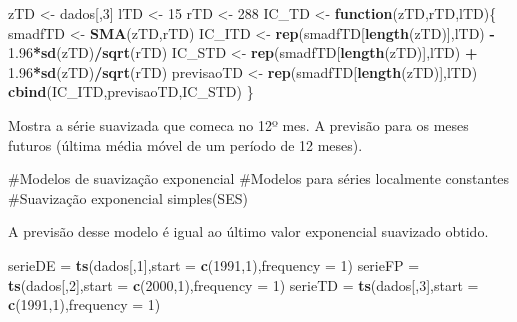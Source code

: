 \documentclass[]{article}
\newenvironment{Shaded}{\begin{snugshade}}{\end{snugshade}}
\newcommand{\ControlFlowTok}[1]{\textcolor[rgb]{0.13,0.29,0.53}{\textbf{#1}}}
\newcommand{\DataTypeTok}[1]{\textcolor[rgb]{0.13,0.29,0.53}{#1}}
\newcommand{\DecValTok}[1]{\textcolor[rgb]{0.00,0.00,0.81}{#1}}
\newcommand{\FloatTok}[1]{\textcolor[rgb]{0.00,0.00,0.81}{#1}}
\newcommand{\KeywordTok}[1]{\textcolor[rgb]{0.13,0.29,0.53}{\textbf{#1}}}
\newcommand{\NormalTok}[1]{#1}
\newcommand{\OperatorTok}[1]{\textcolor[rgb]{0.81,0.36,0.00}{\textbf{#1}}}
\newcommand{\StringTok}[1]{\textcolor[rgb]{0.31,0.60,0.02}{#1}}
\begin{document}
\begin{Shaded}
\begin{Highlighting}[]
\NormalTok{zTD <-}\StringTok{ }\NormalTok{dados[,}\DecValTok{3}\NormalTok{]}
\NormalTok{lTD <-}\StringTok{ }\DecValTok{15}
\NormalTok{rTD <-}\StringTok{ }\DecValTok{288}
\NormalTok{IC_TD <-}\StringTok{ }\ControlFlowTok{function}\NormalTok{(zTD,rTD,lTD)\{}
\NormalTok{smadfTD <-}\StringTok{ }\KeywordTok{SMA}\NormalTok{(zTD,rTD)}
\NormalTok{IC_ITD <-}\StringTok{ }\KeywordTok{rep}\NormalTok{(smadfTD[}\KeywordTok{length}\NormalTok{(zTD)],lTD) }\OperatorTok{-}\StringTok{ }\FloatTok{1.96}\OperatorTok{*}\KeywordTok{sd}\NormalTok{(zTD)}\OperatorTok{/}\KeywordTok{sqrt}\NormalTok{(rTD)}
\NormalTok{IC_STD <-}\StringTok{ }\KeywordTok{rep}\NormalTok{(smadfTD[}\KeywordTok{length}\NormalTok{(zTD)],lTD) }\OperatorTok{+}\StringTok{ }\FloatTok{1.96}\OperatorTok{*}\KeywordTok{sd}\NormalTok{(zTD)}\OperatorTok{/}\KeywordTok{sqrt}\NormalTok{(rTD)}
\NormalTok{previsaoTD <-}\StringTok{ }\KeywordTok{rep}\NormalTok{(smadfTD[}\KeywordTok{length}\NormalTok{(zTD)],lTD)}
\KeywordTok{cbind}\NormalTok{(IC_ITD,previsaoTD,IC_STD)}
\NormalTok{\}}
\end{Highlighting}
\end{Shaded}

Mostra a série suavizada que comeca no 12º mes. A previsão para os meses
futuros (última média móvel de um período de 12 meses).

\#Modelos de suavização exponencial \#Modelos para séries localmente
constantes \#Suavização exponencial simples(SES)

A previsão desse modelo é igual ao último valor exponencial suavizado
obtido.

\begin{Shaded}
\begin{Highlighting}[]
\NormalTok{serieDE =}\StringTok{ }\KeywordTok{ts}\NormalTok{(dados[,}\DecValTok{1}\NormalTok{],}\DataTypeTok{start =} \KeywordTok{c}\NormalTok{(}\DecValTok{1991}\NormalTok{,}\DecValTok{1}\NormalTok{),}\DataTypeTok{frequency =} \DecValTok{1}\NormalTok{)}
\NormalTok{serieFP =}\StringTok{ }\KeywordTok{ts}\NormalTok{(dados[,}\DecValTok{2}\NormalTok{],}\DataTypeTok{start =} \KeywordTok{c}\NormalTok{(}\DecValTok{2000}\NormalTok{,}\DecValTok{1}\NormalTok{),}\DataTypeTok{frequency =} \DecValTok{1}\NormalTok{)}
\NormalTok{serieTD =}\StringTok{ }\KeywordTok{ts}\NormalTok{(dados[,}\DecValTok{3}\NormalTok{],}\DataTypeTok{start =} \KeywordTok{c}\NormalTok{(}\DecValTok{1991}\NormalTok{,}\DecValTok{1}\NormalTok{),}\DataTypeTok{frequency =} \DecValTok{1}\NormalTok{)}
\end{Highlighting}
\end{Shaded}
\end{document}
